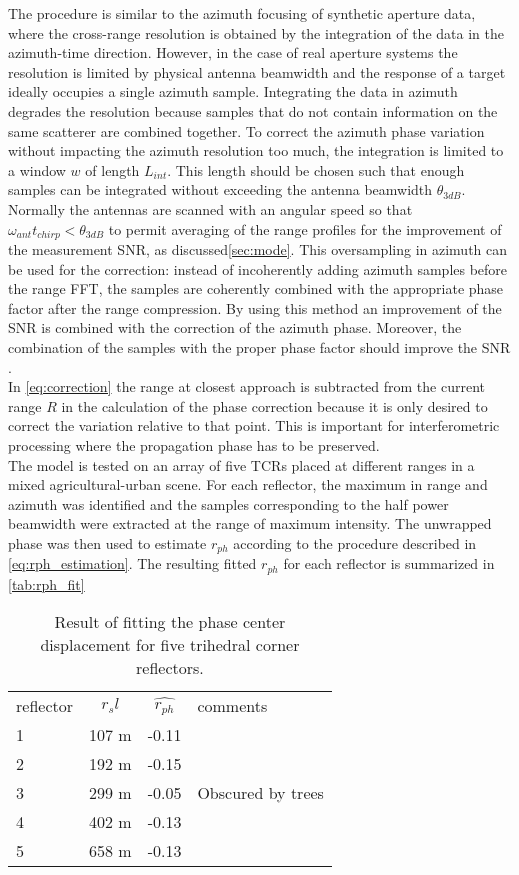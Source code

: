 The procedure is similar to the azimuth focusing of synthetic aperture data, where the cross-range resolution is obtained by the integration of the data in the azimuth-time direction. However, in the case of real aperture systems the resolution is limited by  physical antenna beamwidth and the response of a target ideally occupies a single azimuth sample. Integrating the data in azimuth degrades the resolution because samples that do not contain information on the same scatterer are combined together. To correct the azimuth phase variation without impacting the azimuth resolution  too much, the integration is limited to a window  $w$ of length $L_{int}$. This length  should be chosen such that enough samples can be integrated without exceeding the antenna beamwidth $\theta_{3dB}$. Normally the antennas are scanned with an angular speed so that $\omega_{ant} t_{chirp} < \theta_{3dB}$ to permit averaging of the range profiles for the improvement of the measurement SNR, as discussed\autoref{sec:mode}. This oversampling in azimuth can be used for the correction: instead of incoherently adding azimuth samples before the range FFT, the samples are coherently combined with the appropriate phase factor after the range compression. By using this method an improvement of the SNR is combined with the correction of the azimuth phase. Moreover, the combination of the samples with the proper phase factor should improve the SNR .\\
In \autoref{eq:correction} the range at closest approach is subtracted from the current range $R$ in the calculation of the phase correction because it is only desired to correct the variation relative to that point. This is important for interferometric processing where the propagation phase has to be preserved.\\
The model is tested on an array of five TCRs placed at different ranges in a mixed agricultural-urban scene. For each reflector, the maximum in range and azimuth was identified and the samples corresponding to the half power beamwidth were extracted at the range of maximum intensity. The unwrapped phase was then used to estimate $r_{ph}$ according to the procedure described in \autoref{eq:rph_estimation}. The resulting fitted $r_{ph}$ for each reflector is summarized in \autoref{tab:rph_fit}
\begin{table}[ht]\label{tab:reflector_rph}
	\begin{tabular}{lccl}
		\hline
		reflector & $r_sl$ & $\hat{r_{ph}}$ & comments\\
		1	& 107 m & -0.11 & \\
		2  & 192 m & -0.15 & \\
		3 & 299 m & -0.05 & Obscured by trees\\
		4 & 402 m & -0.13 &\\
		5 & 658 m & -0.13&\\
		\hline
	\end{tabular}
	\caption{Result of fitting the phase center displacement for five trihedral corner reflectors.}
	\label{tab:rph_fit}
\end{table}
